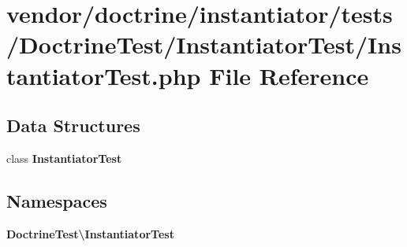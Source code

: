 \section{vendor/doctrine/instantiator/tests/\+Doctrine\+Test/\+Instantiator\+Test/\+Instantiator\+Test.php File Reference}
\label{_instantiator_test_8php}
\subsection*{Data Structures}
\begin{DoxyCompactItemize}
\item 
class {\bf Instantiator\+Test}
\end{DoxyCompactItemize}
\subsection*{Namespaces}
\begin{DoxyCompactItemize}
\item 
 {\bf Doctrine\+Test\textbackslash{}\+Instantiator\+Test}
\end{DoxyCompactItemize}
